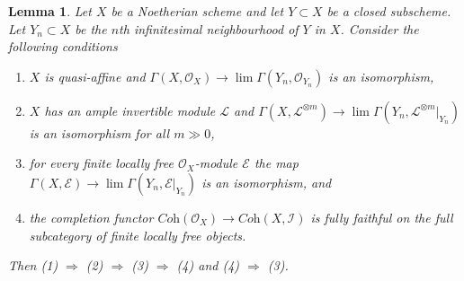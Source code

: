 \documentclass{amsart}
\theoremstyle{plain}
\newtheorem{lemma}[subsection]{Lemma}
\theoremstyle{definition}
\theoremstyle{remark}
\numberwithin{equation}{subsection}
\def\lim{\mathop{\mathrm{lim}}\nolimits}
\begin{document}
\begin{lemma}
\label{algebraization-lemma-completion-fully-faithful}
Let $X$ be a Noetherian scheme and let $Y \subset X$ be a closed subscheme.
Let $Y_n \subset X$ be the $n$th infinitesimal neighbourhood of $Y$ in $X$.
Consider the following conditions
\begin{enumerate}
\item $X$ is quasi-affine and
$\Gamma(X, \mathcal{O}_X) \to \lim \Gamma(Y_n, \mathcal{O}_{Y_n})$
is an isomorphism,
\item $X$ has an ample invertible module $\mathcal{L}$ and
$\Gamma(X, \mathcal{L}^{\otimes m}) \to
\lim \Gamma(Y_n, \mathcal{L}^{\otimes m}|_{Y_n})$
is an isomorphism for all $m \gg 0$,
\item for every finite locally free $\mathcal{O}_X$-module
$\mathcal{E}$ the map
$\Gamma(X, \mathcal{E}) \to \lim \Gamma(Y_n, \mathcal{E}|_{Y_n})$
is an isomorphism, and
\item the completion functor
$\textit{Coh}(\mathcal{O}_X) \to \textit{Coh}(X, \mathcal{I})$
is fully faithful on the full subcategory of finite locally free
objects.
\end{enumerate}
Then (1) $\Rightarrow$ (2) $\Rightarrow$ (3) $\Rightarrow$ (4)
and (4) $\Rightarrow$ (3).
\end{lemma}
\end{document}
